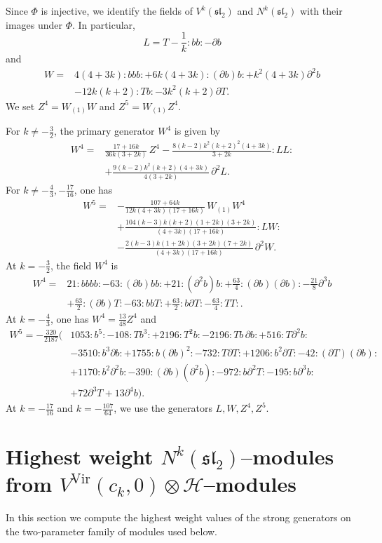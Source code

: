 \documentclass[11 pt]{amsart}
\theoremstyle{definition}
\theoremstyle{plain}
\newcommand{\Vir}{\mathrm{Vir}}
\begin{document}
Since $\Phi$ is injective, we identify the fields of
$V^k(\mathfrak{sl}_2)$ and $N^k(\mathfrak{sl}_2)$ with their images under
$\Phi$.  In particular,
\[
L=T-\frac1k:bb:-\partial b
\]
and
\[
\begin{aligned}
W={}&4(4+3k):bbb:
+6k(4+3k):(\partial b)b:
+k^2(4+3k)\partial^2b \\
&-12k(k+2):Tb:
-3k^2(k+2)\partial T.
\end{aligned}
\]
We set $Z^4=W_{(1)}W$ and $Z^5=W_{(1)}Z^4$.

For $k\neq-\frac32$, the primary generator $W^4$ is given by
\[
\begin{aligned}
W^4={}&\frac{17+16k}{36k(3+2k)}\,Z^4
-\frac{8(k-2)k^2(k+2)^2(4+3k)}{3+2k}:LL: \\
&+\frac{9(k-2)k^2(k+2)(4+3k)}{4(3+2k)}\,\partial^2L.
\end{aligned}
\]
For $k\neq-\frac43,-\frac{17}{16}$, one has
\[
\begin{aligned}
W^5={}&-\frac{107+64k}{12k(4+3k)(17+16k)}\,
  W_{(1)}W^4 \\
&+\frac{104(k-3)k(k+2)(1+2k)(3+2k)}
  {(4+3k)(17+16k)}:LW: \\
&-\frac{2(k-3)k(1+2k)(3+2k)(7+2k)}
  {(4+3k)(17+16k)}\,\partial^2W.
\end{aligned}
\]
At $k=-\frac{3}{2}$, the field $W^4$ is
\[
\begin{aligned}
W^4={}&21:bbbb:
-63:(\partial b)bb:
+21:(\partial^2b)b:
+\frac{63}{4}:(\partial b)(\partial b):
-\frac{21}{8}\partial^3b \\
&+\frac{63}{2}:(\partial b)T:
-63:bbT:
+\frac{63}{2}:b\partial T:
-\frac{63}{4}:TT:.
\end{aligned}
\]
At $k=-\frac{4}{3}$, one has $W^4=\frac{13}{48}Z^4$ and
\[
\begin{aligned}
W^5=-\frac{320}{2187}\Big(&
1053:b^5:
-108:Tb^3:
+2196:T^2b:
-2196:Tb\,\partial b:
+516:T\partial^2b: \\
&-3510:b^3\partial b:
+1755:b(\partial b)^2:
-732:T\partial T:
+1206:b^2\partial T:
-42:(\partial T)(\partial b): \\
&+1170:b^2\partial^2b:
-390:(\partial b)(\partial^2b):
-972:b\partial^2T:
-195:b\partial^3b: \\
&+72\partial^3T
+13\partial^4b
\Big).
\end{aligned}
\]
At $k=-\frac{17}{16}$ and $k=-\frac{107}{64}$, we use the generators
$L,W,Z^4,Z^5$.

\section{Highest weight $N^k(\mathfrak{sl}_2)$--modules from
$V^{\Vir}(c_k,0)\otimes\mathcal H$--modules}
\label{sec:evaluation}
In this section we compute the highest weight values of the strong
generators on the two-parameter family of modules used below.
\end{document}
